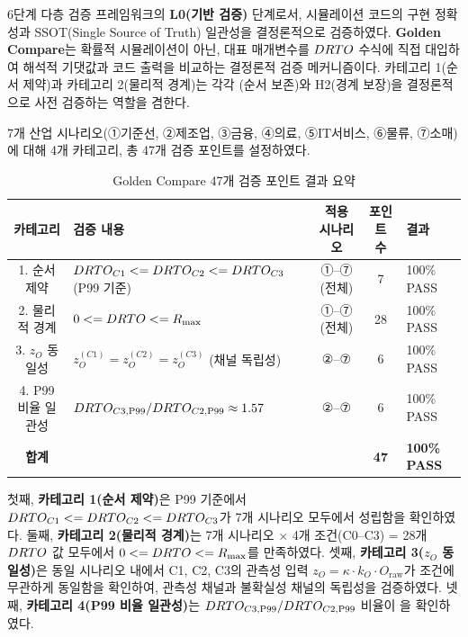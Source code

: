 6단계 다층 검증 프레임워크의 \textbf{L0(기반 검증)} 단계로서,
시뮬레이션 코드의 구현 정확성과 SSOT(Single Source of Truth) 일관성을
결정론적으로 검증하였다.
\textbf{Golden Compare}는 확률적 시뮬레이션이 아닌,
대표 매개변수를 $\DRTO$ 수식에 직접 대입하여
해석적 기댓값과 코드 출력을 비교하는 결정론적 검증 메커니즘이다.
카테고리 1(순서 제약)과 카테고리 2(물리적 경계)는 각각
(순서 보존)와 H2(경계 보장)을 결정론적으로 사전 검증하는 역할을 겸한다.

7개 산업 시나리오(①기준선, ②제조업, ③금융, ④의료, ⑤IT서비스, ⑥물류, ⑦소매)에 대해
4개 카테고리, 총 47개 검증 포인트를  설정하였다.

\begin{table}[htbp]
  \centering
  \caption{Golden Compare 47개 검증 포인트 결과 요약}
  \label{tab:golden_compare_summary}
  \small
  \begin{tabular}{clccl}
    \toprule
    \textbf{카테고리} & \textbf{검증 내용} & \textbf{적용 시나리오} & \textbf{포인트 수} & \textbf{결과} \\
    \midrule
    1. 순서 제약   & $\DRTO_{C1} \leq \DRTO_{C2} \leq \DRTO_{C3}$ (P99 기준) & ①--⑦ (전체) & 7  & 100\% PASS \\
    2. 물리적 경계 & $0 \leq \DRTO \leq R_{\max}$                              & ①--⑦ (전체) & 28 & 100\% PASS \\
    3. $z_O$ 동일성 & $z_O^{(C1)} = z_O^{(C2)} = z_O^{(C3)}$ (채널 독립성)    & ②--⑦ & 6  & 100\% PASS \\
    4. P99 비율 일관성 & $\DRTO_{C3,\text{P99}} / \DRTO_{C2,\text{P99}} \approx \erf{1.57}{1.66}$ & ②--⑦ & 6  & 100\% PASS \\
    \midrule
    \textbf{합계} & & & \textbf{47} & \textbf{100\% PASS} \\
    \bottomrule
  \end{tabular}
\end{table}


첫째, \textbf{카테고리 1(순서 제약)}은 P99 기준에서
$\DRTO_{C1} \leq \DRTO_{C2} \leq \DRTO_{C3}$가 7개 시나리오 모두에서 성립함을 확인하였다.
둘째, \textbf{카테고리 2(물리적 경계)}는 7개 시나리오 $\times$ 4개 조건(C0--C3) = 28개 $\DRTO$ 값
모두에서 $0 \leq \DRTO \leq R_{\max}$를 만족하였다.
셋째, \textbf{카테고리 3($z_O$ 동일성)}은 동일 시나리오 내에서 C1, C2, C3의
관측성 입력 $z_O = \kappa \cdot k_O \cdot O_{\text{raw}}$가 조건에 무관하게
동일함을 확인하여, 관측성 채널과 불확실성 채널의 독립성을 검증하였다.
넷째, \textbf{카테고리 4(P99 비율 일관성)}는 $\DRTO_{C3,\text{P99}} / \DRTO_{C2,\text{P99}}$
비율이 을 확인하였다.


